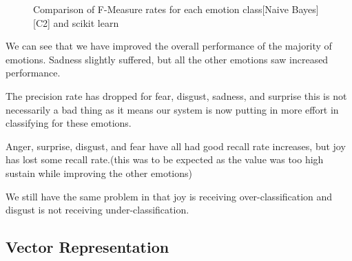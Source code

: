 \begin{figure}[H]
\center
{}
\caption{Comparison of F-Measure rates for each emotion class[Naive Bayes][C2] and scikit learn}
\end{figure}

\fi

We can see that we have improved the overall performance of the majority of emotions. Sadness slightly suffered, but all the other emotions saw increased performance.

The precision rate has dropped for fear, disgust, sadness, and surprise this is not necessarily a bad thing as it means our system is now putting in more effort in classifying for these emotions.

Anger, surprise, disgust, and fear have all had good recall rate increases, but joy has lost some recall rate.(this was to be expected as the value was too high sustain while improving the other emotions)

We still have the same problem in that joy is receiving over-classification and disgust is not receiving under-classification.

\subsection{Vector Representation} \label{vec_rep}

